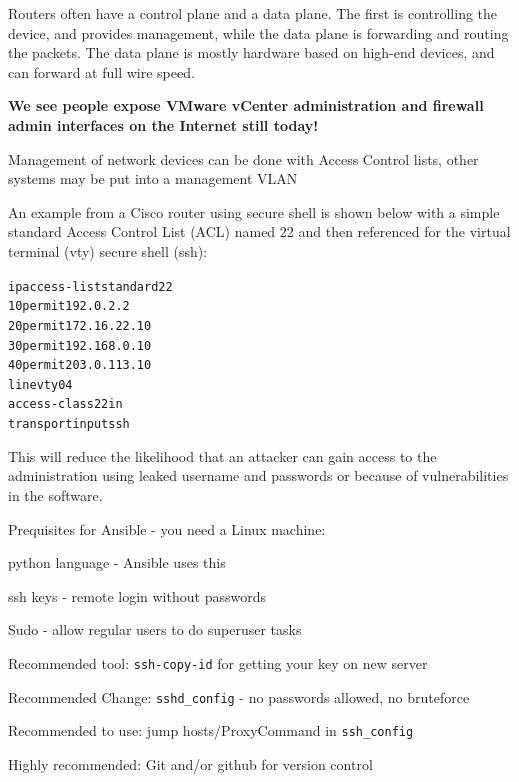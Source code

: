 \documentclass[Screen16to9,17pt]{foils}
\begin{document}


Routers often have a control plane and a data plane. The first is controlling the device, and provides management, while the data plane is forwarding and routing the packets. The data plane is mostly hardware based on high-end devices, and can forward at full wire speed.

{\bf We see people expose VMware vCenter administration and firewall admin interfaces on the Internet still today!}



Management of network devices can be done with Access Control lists, other systems may be put into a management VLAN

An example from a Cisco router using secure shell is shown below with a simple standard Access Control List (ACL) named 22 and then referenced for the virtual terminal (vty) secure shell (ssh):

\begin{alltt}\scriptsize
ip access-list standard 22
10 permit 192.0.2.2
20 permit 172.16.22.10
30 permit 192.168.0.10
40 permit 203.0.113.10
line vty 0 4
  access-class 22 in
  transport input ssh
\end{alltt}

This will reduce the likelihood that an attacker can gain access to the administration using leaked username and passwords or because of vulnerabilities in the software.


Prequisites for Ansible - you need a Linux machine:
\begin{list2}
\item python language - Ansible uses this
\item ssh keys - remote login without passwords
\item Sudo - allow regular users to do superuser tasks
\item Recommended tool: \verb+ssh-copy-id+ for getting your key on new server
\item Recommended Change: \verb+sshd_config+ - no passwords allowed, no bruteforce
\item Recommended to use: jump hosts/ProxyCommand in \verb+ssh_config+
\item Highly recommended: Git and/or github for version control
\end{list2}
\end{document}
